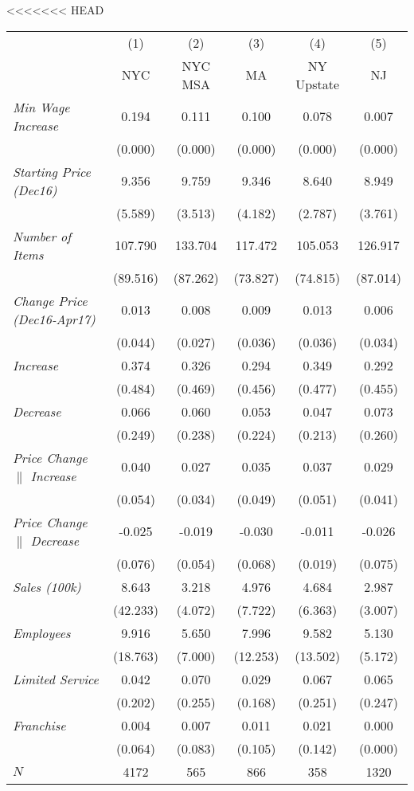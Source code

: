 <<<<<<< HEAD
\begin{center}
\begin{tabular}{lccccc}
\hline  & (1) & (2) & (3) & (4) & (5)\\
 & NYC & NYC MSA & MA & NY Upstate & NJ\\
\hline  \textit{Min Wage Increase}  & 0.194 & 0.111 & 0.100 & 0.078 & 0.007\\
  & (0.000) & (0.000) & (0.000) & (0.000) & (0.000)\\
 \textit{Starting Price (Dec16)}  & 9.356 & 9.759 & 9.346 & 8.640 & 8.949\\
  & (5.589) & (3.513) & (4.182) & (2.787) & (3.761)\\
 \textit{Number of Items}  & 107.790 & 133.704 & 117.472 & 105.053 & 126.917\\
  & (89.516) & (87.262) & (73.827) & (74.815) & (87.014)\\
 \textit{Change Price (Dec16-Apr17)}  & 0.013 & 0.008 & 0.009 & 0.013 & 0.006\\
  & (0.044) & (0.027) & (0.036) & (0.036) & (0.034)\\
 \textit{Increase}  & 0.374 & 0.326 & 0.294 & 0.349 & 0.292\\
  & (0.484) & (0.469) & (0.456) & (0.477) & (0.455)\\
 \textit{Decrease}  & 0.066 & 0.060 & 0.053 & 0.047 & 0.073\\
  & (0.249) & (0.238) & (0.224) & (0.213) & (0.260)\\
 \textit{Price Change $\|$ Increase}  & 0.040 & 0.027 & 0.035 & 0.037 & 0.029\\
  & (0.054) & (0.034) & (0.049) & (0.051) & (0.041)\\
 \textit{Price Change $\|$ Decrease}  & -0.025 & -0.019 & -0.030 & -0.011 & -0.026\\
  & (0.076) & (0.054) & (0.068) & (0.019) & (0.075)\\
 \textit{Sales (100k)}  & 8.643 & 3.218 & 4.976 & 4.684 & 2.987\\
  & (42.233) & (4.072) & (7.722) & (6.363) & (3.007)\\
 \textit{Employees} & 9.916 & 5.650 & 7.996 & 9.582 & 5.130\\
  & (18.763) & (7.000) & (12.253) & (13.502) & (5.172)\\
 \textit{Limited Service}  & 0.042 & 0.070 & 0.029 & 0.067 & 0.065\\
  & (0.202) & (0.255) & (0.168) & (0.251) & (0.247)\\
 \textit{Franchise}  & 0.004 & 0.007 & 0.011 & 0.021 & 0.000\\
  & (0.064) & (0.083) & (0.105) & (0.142) & (0.000)\\
\hline  $ N $  & 4172 & 565 & 866 & 358 & 1320\\
\hline\end{tabular}\\
\end{center}

